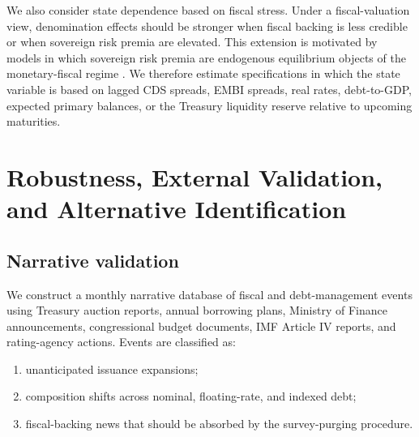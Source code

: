 \documentclass[12pt,a4paper]{article}
\begin{document}
We also consider state dependence based on fiscal stress. Under a fiscal-valuation view, denomination effects should be stronger when fiscal backing is less credible or when sovereign risk premia are elevated. This extension is motivated by models in which sovereign risk premia are endogenous equilibrium objects of the monetary-fiscal regime \citep{Uribe2006}. We therefore estimate specifications in which the state variable is based on lagged CDS spreads, EMBI spreads, real rates, debt-to-GDP, expected primary balances, or the Treasury liquidity reserve relative to upcoming maturities.


\section{Robustness, External Validation, and Alternative Identification}
\label{sec:robustness}

\subsection{Narrative validation}

We construct a monthly narrative database of fiscal and debt-management events using Treasury auction reports, annual borrowing plans, Ministry of Finance announcements, congressional budget documents, IMF Article IV reports, and rating-agency actions. Events are classified as:
\begin{enumerate}[leftmargin=1.2cm]
    \item unanticipated issuance expansions;
    \item composition shifts across nominal, floating-rate, and indexed debt;
    \item fiscal-backing news that should be absorbed by the survey-purging procedure.
\end{enumerate}
\end{document}
